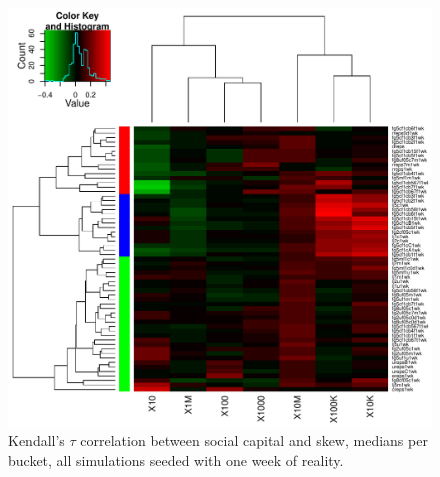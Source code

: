 \documentclass[10pt,oneside]{memoir}
\begin{document}
\begin{Spacing}{2}
\begin{figure}
\begin{center}
    \includegraphics{figures/crop/heatmap-cstaubs-medians-1wk}
    \caption{Kendall’s $\tau$ correlation between social capital and skew, medians per bucket, all simulations seeded with one week of reality.}
    \label{figure:heatmap-cstaubs-1wk}
\end{center}
\end{figure}


\end{Spacing}
\end{document}
